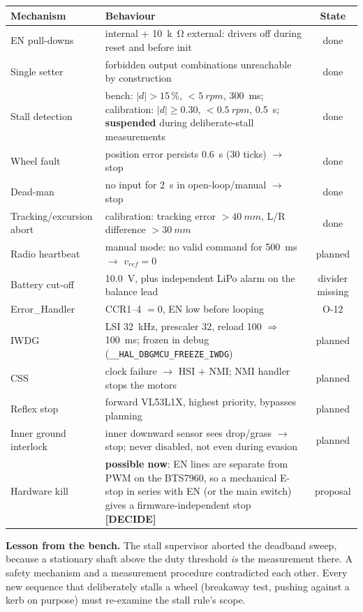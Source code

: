 \documentclass[11pt,a4paper]{article}
\newcommand{\mk}[2]{\textsf{\scriptsize\bfseries\colorbox{#1bg}{\color{#1}[#2]}}}
\newcommand{\DECIDE}{\mk{accent}{DECIDE}}
\newcommand{\tg}[1]{{\small\textcolor{good}{\textsf{#1}}}}
\newcommand{\tw}[1]{{\small\textcolor{warn}{\textsf{#1}}}}
\newcommand{\tk}[1]{{\small\textcolor{cold}{\textsf{#1}}}}
\newcommand{\code}[1]{\texttt{\small #1}}
\begin{document}
\begin{center}
\small
\begin{tabularx}{\textwidth}{@{}lLc@{}}
\toprule
\textbf{Mechanism} & \textbf{Behaviour} & \textbf{State}\\
\midrule
EN pull-downs & internal + \qty{10}{k\ohm} external: drivers off during reset and before init & \tg{done}\\
Single setter & forbidden output combinations unreachable by construction & \tg{done}\\
Stall detection & bench: $|d|>15\,\%$, $<\qty{5}{rpm}$, \qty{300}{ms}; calibration: $|d|\ge0.30$, $<\qty{0.5}{rpm}$, \qty{0.5}{s}; \textbf{suspended} during deliberate-stall measurements & \tg{done}\\
Wheel fault & position error persists \qty{0.6}{s} (30 ticks) $\to$ stop & \tg{done}\\
Dead-man & no input for \qty{2}{s} in open-loop/manual $\to$ stop & \tg{done}\\
Tracking/excursion abort & calibration: tracking error $>\qty{40}{mm}$, L/R difference $>\qty{30}{mm}$ & \tg{done}\\
Radio heartbeat & manual mode: no valid command for \qty{500}{ms} $\to$ $v_{ref}=0$ & \tk{planned}\\
Battery cut-off & \qty{10.0}{V}, plus independent LiPo alarm on the balance lead & \tw{divider missing}\\
Error\_Handler & CCR1--4 $=0$, EN low before looping & \tw{O-12}\\
IWDG & LSI \qty{32}{kHz}, prescaler 32, reload 100 $\Rightarrow$ \qty{100}{ms}; frozen in debug (\code{\_\_HAL\_DBGMCU\_FREEZE\_IWDG}) & \tk{planned}\\
CSS & clock failure $\to$ HSI + NMI; NMI handler stops the motors & \tk{planned}\\
Reflex stop & forward VL53L1X, highest priority, bypasses planning & \tk{planned}\\
Inner ground interlock & inner downward sensor sees drop/grass $\to$ stop; never disabled, not even during evasion & \tk{planned}\\
Hardware kill & \textbf{possible now}: EN lines are separate from PWM on the BTS7960, so a mechanical E-stop in series with EN (or the main switch) gives a firmware-independent stop \DECIDE & \tk{proposal}\\
\bottomrule
\end{tabularx}
\end{center}

\begin{warnbox}
\textbf{Lesson from the bench.} The stall supervisor aborted the deadband sweep,
because a stationary shaft above the duty threshold \emph{is} the measurement
there. A safety mechanism and a measurement procedure contradicted each other.
Every new sequence that deliberately stalls a wheel (breakaway test, pushing
against a kerb on purpose) must re-examine the stall rule's scope.
\end{warnbox}
\clearpage
\end{document}
